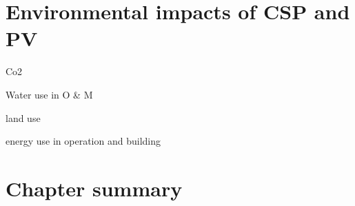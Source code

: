 \section{Environmental impacts of CSP and PV}
Co2

Water use in O \& M

land use

energy use in operation and building
\cite{EASAC2011}

\cite{Caldes2012} 

\section{Chapter summary}

\pagebreak
